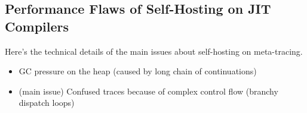 \subsection{Performance Flaws of Self-Hosting on JIT Compilers}
\label{subsec:performance}


Here's the technical details of the main issues about self-hosting
on meta-tracing.

\begin{itemize}
\item GC pressure on the heap (caused by long chain of continuations)

\item (main issue) Confused traces because of complex control flow
(branchy dispatch loops)
\end{itemize}
